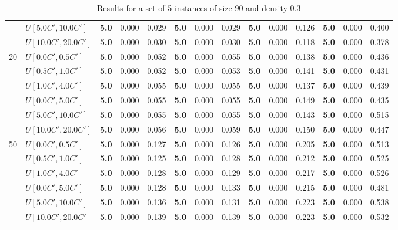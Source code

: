 \begin{table}[h]
{\begin{tabular}{|l|l||l|l|l||l|l|l||l|l|l||l|l|l|}
       & $U[5.0C',10.0C']$ & \textbf{5.0} & 0.000 & 0.029 & \textbf{5.0} & 0.000 & 0.029 & \textbf{5.0} & 0.000 & 0.126 & \textbf{5.0} & 0.000 & 0.400 \\
       & $U[10.0C',20.0C']$ & \textbf{5.0} & 0.000 & 0.030 & \textbf{5.0} & 0.000 & 0.030 & \textbf{5.0} & 0.000 & 0.118 & \textbf{5.0} & 0.000 & 0.378 \\
      \hline\hline
      \multirow{6}{*}{20} & $U[0.0C',0.5C']$ & \textbf{5.0} & 0.000 & 0.052 & \textbf{5.0} & 0.000 & 0.055 & \textbf{5.0} & 0.000 & 0.138 & \textbf{5.0} & 0.000 & 0.436 \\
       & $U[0.5C',1.0C']$ & \textbf{5.0} & 0.000 & 0.052 & \textbf{5.0} & 0.000 & 0.053 & \textbf{5.0} & 0.000 & 0.141 & \textbf{5.0} & 0.000 & 0.431 \\
       & $U[1.0C',4.0C']$ & \textbf{5.0} & 0.000 & 0.055 & \textbf{5.0} & 0.000 & 0.055 & \textbf{5.0} & 0.000 & 0.137 & \textbf{5.0} & 0.000 & 0.439 \\
       & $U[0.0C',5.0C']$ & \textbf{5.0} & 0.000 & 0.055 & \textbf{5.0} & 0.000 & 0.055 & \textbf{5.0} & 0.000 & 0.149 & \textbf{5.0} & 0.000 & 0.435 \\
       & $U[5.0C',10.0C']$ & \textbf{5.0} & 0.000 & 0.055 & \textbf{5.0} & 0.000 & 0.055 & \textbf{5.0} & 0.000 & 0.143 & \textbf{5.0} & 0.000 & 0.515 \\
       & $U[10.0C',20.0C']$ & \textbf{5.0} & 0.000 & 0.056 & \textbf{5.0} & 0.000 & 0.059 & \textbf{5.0} & 0.000 & 0.150 & \textbf{5.0} & 0.000 & 0.447 \\
      \hline\hline
      \multirow{6}{*}{50} & $U[0.0C',0.5C']$ & \textbf{5.0} & 0.000 & 0.127 & \textbf{5.0} & 0.000 & 0.126 & \textbf{5.0} & 0.000 & 0.205 & \textbf{5.0} & 0.000 & 0.513 \\
       & $U[0.5C',1.0C']$ & \textbf{5.0} & 0.000 & 0.125 & \textbf{5.0} &  0.000 & 0.128 & \textbf{5.0} & 0.000 & 0.212 & \textbf{5.0} & 0.000 & 0.525 \\
       & $U[1.0C',4.0C']$ & \textbf{5.0} & 0.000 & 0.128 & \textbf{5.0} & 0.000 & 0.129 & \textbf{5.0} & 0.000 & 0.217 & \textbf{5.0} & 0.000 & 0.526 \\
       & $U[0.0C',5.0C']$ & \textbf{5.0} & 0.000 & 0.128 & \textbf{5.0} & 0.000 & 0.133 & \textbf{5.0} & 0.000 & 0.215 & \textbf{5.0} & 0.000 & 0.481 \\
       & $U[5.0C',10.0C']$ & \textbf{5.0} & 0.000 & 0.136 & \textbf{5.0} & 0.000 & 0.131 & \textbf{5.0} & 0.000 & 0.223 & \textbf{5.0} & 0.000 & 0.538 \\
       & $U[10.0C',20.0C']$ & \textbf{5.0} & 0.000 & 0.139 & \textbf{5.0} & 0.000 & 0.139 & \textbf{5.0} & 0.000 & 0.223 & \textbf{5.0} & 0.000 & 0.532 \\
      \hline
      \end{tabular}
      }
      \caption{Results for a set of 5 instances of size $90$ and density $0.3$}
      \label{tab:pcpn90p3}\end{table}
      

